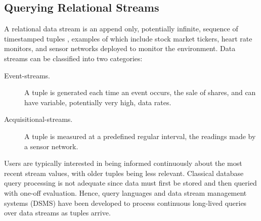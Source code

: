 \subsection{Querying Relational Streams}
\label{sec:query-relat-streams}

A relational data stream is an append only, potentially infinite, sequence of timestamped tuples \cite{Golab2003Issues-in-data-}, examples of which include stock market tickers, heart rate monitors, and sensor networks deployed to monitor the environment.
Data streams can be classified into two categories:
\begin{description}
\item[Event-streams.] A tuple is generated each time an event occurs, \eg the sale of shares, and can have variable, potentially very high, data rates.
\item[Acquisitional-streams.] A tuple is measured at a predefined regular interval, \eg the readings made by a sensor network.
\end{description}
Users are typically interested in being informed continuously about the most recent stream values, with older tuples being less relevant.
Classical database query processing is not adequate since data must first be stored and then queried with one-off evaluation.
Hence, query languages \cite{Brenninkmeijer_08,Arasu_2006} and data stream management systems (DSMS) \cite{Arasu_06a,Abadi_2005,Galpin_09,Madden_05} have been developed to process continuous long-lived queries over data streams as tuples arrive.

